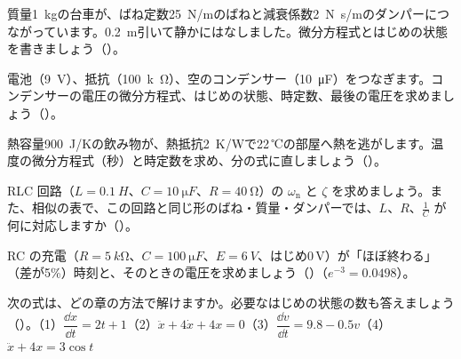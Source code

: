 \bkendproblems
{}

\bkproblem 質量\qty{1}{kg}の台車が、ばね定数\qty{25}{N/m}のばねと減衰係数\qty{2}{N.s/m}のダンパーにつながっています。\qty{0.2}{m}引いて静かにはなしました。微分方程式とはじめの状態を書きましょう\mbox{（）}。

\bkproblem 電池（\qty{9}{V}）、抵抗（\qty{100}{k\ohm}）、空のコンデンサー（\qty{10}{\micro F}）をつなぎます。コンデンサーの電圧の微分方程式、はじめの状態、時定数、最後の電圧を求めましょう\mbox{（）}。

\bkproblem 熱容量\qty{900}{J/K}の飲み物が、熱抵抗\qty{2}{K/W}で22\,℃の部屋へ熱を逃がします。温度の微分方程式（秒）と時定数を求め、分の式に直しましょう\mbox{（）}。

\bkproblem RLC 回路（$L=\qty{0.1}{H}$、$C=\qty{10}{\micro F}$、$R=\qty{40}{\ohm}$）の $\omega_{\mathrm n}$ と $\zeta$ を求めましょう。また、相似の表で、この回路と同じ形のばね・質量・ダンパーでは、$L$、$R$、$\frac1C$ が何に対応しますか\mbox{（）}。

\bkproblem RC の充電（$R=\qty{5}{k\ohm}$、$C=\qty{100}{\micro F}$、$E=\qty{6}{V}$、はじめ0\,V）が「ほぼ終わる」（差が5\%）時刻と、そのときの電圧を求めましょう\mbox{（）}（$e^{-3}=0.0498$）。

\bkproblem 次の式は、どの章の方法で解けますか。必要なはじめの状態の数も答えましょう\mbox{（）}。\newline （1）$\dfrac{\dd x}{\dd t}=2t+1$\newline （2）$\ddot x+4\dot x+4x=0$\newline （3）$\dfrac{\dd v}{\dd t}=9.8-0.5v$\newline （4）$\ddot x+4x=3\cos t$

